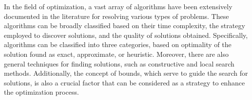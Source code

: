 In the field of optimization, a vast array of algorithms have been extensively
documented in the literature for resolving various types of problems. These
algorithms can be broadly classified based on their time complexity, the
strategy employed to discover solutions, and the quality of solutions obtained.
Specifically, algorithms can be classified into three categories, based on
optimality of the solution found as exact, approximate, or heuristic. Moreover,
there are also general techniques for finding solutions, such as constructive
and local search methods. Additionally, the concept of bounds, which serve to
guide the search for solutions, is also a crucial factor that can be considered
as a strategy to enhance the optimization process.

% 
% 
% 

